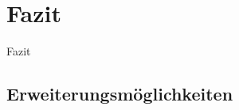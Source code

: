 \newpage

\section{Fazit} \label{fazit}
Fazit

\subsection{Erweiterungsmöglichkeiten} \label{erweiterungsmoeglichkeiten}
